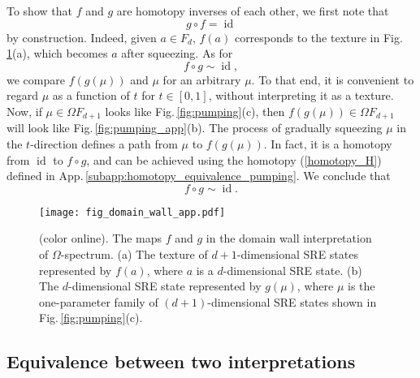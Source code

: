 \documentclass[sort&compress]{elsarticle}
\theoremstyle{theoremstyle}
\theoremstyle{framedtheoremstyle}
\theoremstyle{definitionstyle}
\theoremstyle{definitionstyle}
\theoremstyle{definitionstyle}
\theoremstyle{definitionstyle}
\theoremstyle{nameddefinitionstyle}
\theoremstyle{framednameddefinitionstyle}
\theoremstyle{proofstyle}
\theoremstyle{definitionstyle}
\DeclareMathOperator{\identity}{id}
\newcommand{\paren}[1]{\left( #1 \right)}
\begin{document}
\begin{appendices}
To show that $f$ and $g$ are homotopy inverses of each other, we first note that
\begin{equation}
g \circ f = \identity
\end{equation}
by construction. Indeed, given $a\in F_d$, $f(a)$ corresponds to the texture in Fig.\,\ref{fig:domain_wall_app}(a),
which becomes $a$ after squeezing. As for
\begin{equation}
f \circ g \sim \identity,
\end{equation}
we compare $f\paren{g\paren{\mu}}$ and $\mu$ for an arbitrary $\mu$. To that end, it is convenient to regard $\mu$ as a function of $t$ for $t\in [0,1]$, without interpreting it as a texture. Now, if $\mu \in \Omega F_{d+1}$ looks like Fig.\,\ref{fig:pumping}(c), then $f\paren{g\paren{\mu}} \in \Omega F_{d+1}$ will look like Fig.\,\ref{fig:pumping_app}(b).
The process of gradually squeezing $\mu$ in the $t$-direction defines a path from $\mu$ to $f\paren{g\paren{\mu}}$. In fact, it is a homotopy from $\identity$ to $f \circ g$, and can be achieved using the homotopy (\ref{homotopy_H}) defined in App.\,\ref{subapp:homotopy_equivalence_pumping}. We conclude that
\begin{equation}
f \circ g \sim \identity.
\end{equation}

\begin{figure}
\centering
\texttt{[image: fig\_domain\_wall\_app.pdf]}
\caption{(color online). The maps $f$ and $g$ in the domain wall interpretation of $\Omega$-spectrum. (a) The texture of $d+1$-dimensional SRE states represented by $f(a)$, where $a$ is a $d$-dimensional SRE state. (b) The $d$-dimensional SRE state represented by $g(\mu)$, where $\mu$ is the one-parameter family of $(d+1)$-dimensional SRE states shown in Fig.\,\ref{fig:pumping}(c).}
\label{fig:domain_wall_app}
\end{figure}


\subsection{Equivalence between two interpretations\label{subapp:homotopy_equivalence_equivalence}}


\end{appendices}
\end{document}
